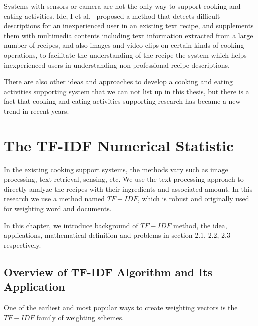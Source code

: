 Systems with sensors or camera are not the only way to support cooking and eating activities. Ide, I et al.~\cite{ide:inexper} proposed a method that detects difficult descriptions for an inexperienced user in an existing text recipe, and supplements them with multimedia contents including text information extracted from a large number of recipes, and also images and video clips on certain kinds of cooking operations, to facilitate the understanding of the recipe the system which helps inexperienced users in understanding non-professional recipe descriptions.

There are also other ideas and approaches to develop a cooking and eating activities supporting system that we can not list up in this thesis, but there is a fact that cooking and eating activities supporting research has became a new trend in recent years.

\section{The TF-IDF Numerical Statistic}

In the existing cooking support systems, the methods vary such as image processing, text retrieval, sensing, etc. We use the text processing approach to directly analyze the recipes with their ingredients and associated amount. In this research we use a method named $TF-IDF$, which is robust and originally used for weighting word and documents. 

In this chapter, we introduce background of $TF-IDF$ method, the idea, applications, mathematical definition and problems in section 2.1, 2.2, 2.3 respectively.  

\clearpage
\subsection{Overview of TF-IDF Algorithm and Its Application}\label{sec:bg_intro}


One of the earliest and most popular ways to create weighting vectors is the $TF-IDF$ family of weighting schemes.  


